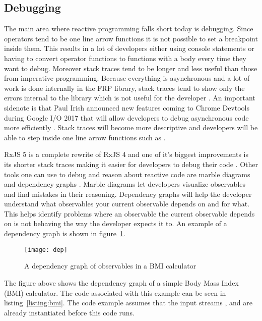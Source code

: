 \subsection{Debugging}

The main area where reactive programming falls short today is debugging. Since operators tend to be one line arrow functions it is not possible to set a breakpoint inside them. This results in a lot of developers either using console statements or having to convert operator functions to functions with a body every time they want to debug. Moreover stack traces tend to be longer and less useful than those from imperative programming. Because everything is asynchronous and a lot of work is done internally in the FRP library, stack traces tend to show only the errors internal to the library which is not useful for the developer \cite{debug}. An important sidenote is that Paul Irish announced new features coming to Chrome Devtools during Google I/O 2017 that will allow developers to debug asynchronous code more efficiently \cite{devtools}. Stack traces will become more descriptive and developers will be able to step inside one line arrow functions such as  \cite{devtools}.

RxJS 5 is a complete rewrite of RxJS 4 and one of it's biggest improvements is its shorter stack traces making it easier for developers to debug their code \cite{debug}. Other tools one can use to debug and reason about reactive code are marble diagrams and dependency graphs \cite{debug}. Marble diagrams let developers visualize observables and find mistakes in their reasoning. Dependency graphs will help the developer understand what observables your current observable depends on and for what. This helps identify problems where an observable the current observable depends on is not behaving the way the developer expects it to. An example of a dependency graph is shown in figure~\ref{figure:depgraph}.

\begin{figure}[H]
	\centering
	\texttt{[image: dep]}
	\caption{A dependency graph of observables in a BMI calculator \cite{debug}}
	\label{figure:depgraph}
\end{figure}

The figure above shows the dependency graph of a simple Body Mass Index (BMI) calculator. The code associated with this example can be seen in listing~\ref{listing:bmi}. The code example assumes that the input streams ,  and  are already instantiated before this code runs. 

